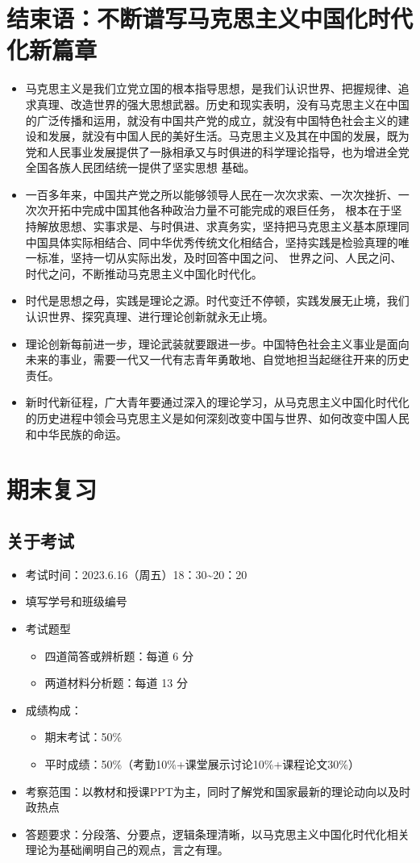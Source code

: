 \documentclass[12pt,openany]{ctexbook}
\begin{document}
\chapter{结束语：不断谱写马克思主义中国化时代化新篇章}
\begin{itemize}
  \item 马克思主义是我们立党立国的根本指导思想，是我们认识世界、把握规律、追求真理、改造世界的强大思想武器。历史和现实表明，没有马克思主义在中国的广泛传播和运用，就没有中国共产党的成立，就没有中国特色社会主义的建设和发展，就没有中国人民的美好生活。马克思主义及其在中国的发展，既为党和人民事业发展提供了一脉相承又与时俱进的科学理论指导，也为增进全党全国各族人民团结统一提供了坚实思想 基础。
  \item 一百多年来，中国共产党之所以能够领导人民在一次次求索、一次次挫折、一次次开拓中完成中国其他各种政治力量不可能完成的艰巨任务， 根本在于坚持解放思想、实事求是、与时俱进、求真务实，坚持把马克思主义基本原理同中国具体实际相结合、同中华优秀传统文化相结合，坚持实践是检验真理的唯一标准，坚持一切从实际出发，及时回答中国之问、 世界之问、人民之问、时代之问，不断推动马克思主义中国化时代化。
  \item 时代是思想之母，实践是理论之源。时代变迁不停顿，实践发展无止境，我们认识世界、探究真理、进行理论创新就永无止境。
  \item 理论创新每前进一步，理论武装就要跟进一步。中国特色社会主义事业是面向未来的事业，需要一代又一代有志青年勇敢地、自觉地担当起继往开来的历史责任。
  \item 新时代新征程，广大青年要通过深入的理论学习，从马克思主义中国化时代化的历史进程中领会马克思主义是如何深刻改变中国与世界、如何改变中国人民和中华民族的命运。
\end{itemize}
\chapter{期末复习}
\section{关于考试}
\begin{itemize}
  \item 考试时间：2023.6.16（周五）18：30\textasciitilde{}20：20
  \item 填写学号和班级编号
  \item 考试题型
\begin{itemize}
  \item 四道简答或辨析题：每道 6 分
  \item 两道材料分析题：每道 13 分
\end{itemize}
  \item 成绩构成：
\begin{itemize}
  \item 期末考试：50\%
  \item 平时成绩：50\%（考勤10\%+课堂展示讨论10\%+课程论文30\%）
\end{itemize}
  \item 考察范围：以教材和授课PPT为主，同时了解党和国家最新的理论动向以及时政热点
  \item 答题要求：分段落、分要点，逻辑条理清晰，以马克思主义中国化时代化相关理论为基础阐明自己的观点，言之有理。
\end{itemize}
\end{document}
